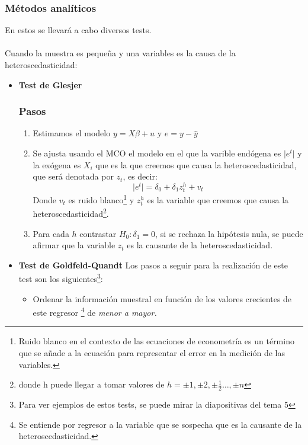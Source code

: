 \documentclass[a4paper,12pt]{article}
\newcommand{\ecuacion}[1]{\ensuremath{#1}}
\begin{document}
\subsubsection{Métodos analíticos}
En estos se llevará a cabo diversos tests.\\\\
Cuando la muestra es pequeña y una variables es la causa de la heteroscedasticidad:
\begin{itemize}
    \item \textbf{Test de Glesjer}
    \subsubsection*{Pasos}
    \begin{enumerate}
        \item Estimamos el modelo \ecuacion{y = X\beta + u} y \ecuacion{e = y - \hat{y}}
        \item Se ajusta usando el MCO el modelo en el que la varible endógena es \ecuacion{\lvert e^t \rvert} y la exógena es \ecuacion{X_i} que es la que creemos que causa la heteroscedasticidad, que será denotada por \ecuacion{z_t}, es decir:
        \begin{equation}
            \lvert e^t \rvert = \delta_0 + \delta_1 z_t^h + v_t
        \end{equation}
        Donde \ecuacion{v_t} es ruido blanco\footnote{Ruido blanco en el contexto de las ecuaciones de econometría es un término que se añade a la ecuación para representar el error en la medición de las variables.} y \ecuacion{z_t^h} es la variable que creemos que causa la heteroscedasticidad\footnote{donde h puede llegar a tomar valores de \ecuacion{h = \pm 1, \pm 2, \pm \frac{1}{2}\ldots, \pm n}}.
        \item Para cada \ecuacion{h} contrastar \ecuacion{H_0 : \delta_1 = 0}, si se rechaza la hipótesis nula, se puede afirmar que la variable \ecuacion{z_t} es la causante de la heteroscedasticidad.
    \end{enumerate}
    \item \textbf{Test de Goldfeld-Quandt}
    Los pasos a seguir para la realización de este test son los siguientes\footnote{Para ver ejemplos de estos tests, se puede mirar la diapositivas del tema 5}:
    \begin{itemize}
        \item Ordenar la información muestral en función de los valores crecientes de este regresor \footnote{Se entiende por regresor a la variable que se sospecha que es la causante de la heteroscedasticidad.} de \textit{menor a mayor.}

\end{itemize}
\end{itemize}
\end{document}
